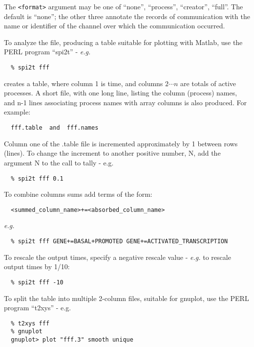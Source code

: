 \noindent
The \verb+<format>+ argument may be one of ``none'', ``process'',
``creator'', ``full''.  The default is ``none''; the other three
annotate the records of communication with the name or identifier
of the channel over which the communication occurred.

\noindent
To analyze the file, producing a table suitable for plotting with
Matlab, use the PERL program ``spi2t'' - {\em e.g.}

\begin{verbatim}
  % spi2t fff
\end{verbatim}

creates a table, where column 1 is time, and columns $2 \cdots n$ are totals
of active processes.  A short file, with one long line, listing the
column (process) names, and n-1 lines associating process names with
array columns is also produced.  For example:

\begin{verbatim}
  fff.table  and  fff.names
\end{verbatim}

\noindent
Column one of the .table file is incremented approximately by 1 between
rows (lines).  To change the increment to another positive number, N,
add the argument N to the call to tally - e.g.

\begin{verbatim}
  % spi2t fff 0.1
\end{verbatim}

\noindent
To combine columns sums add terms of the form:

\begin{verbatim}
  <summed_column_name>+=<absorbed_column_name>
\end{verbatim}
{\em e.g.}
\begin{verbatim}
  % spi2t fff GENE+=BASAL+PROMOTED GENE+=ACTIVATED_TRANSCRIPTION
\end{verbatim}

\noindent
To rescale the output times, specify a negative rescale value - {\em e.g.}
to rescale output times by 1/10:
\begin{verbatim}
  % spi2t fff -10
\end{verbatim}

\noindent
To split the table into multiple 2-column files, suitable for gnuplot,
use the PERL program ``t2xys'' - e.g.

\begin{verbatim}
  % t2xys fff
  % gnuplot
  gnuplot> plot "fff.3" smooth unique
\end{verbatim}

